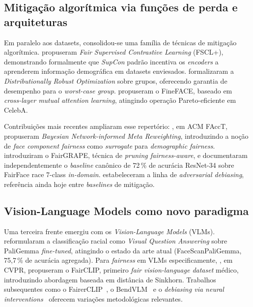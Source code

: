 \subsection{Mitigação algorítmica via funções de perda e arquiteturas}
\label{sec:rl_mitigacao}

Em paralelo aos datasets, consolidou-se uma família de técnicas de mitigação algorítmica. \textcite{park2022fair} propuseram \emph{Fair Supervised Contrastive Learning} (FSCL+), demonstrando formalmente que \emph{SupCon} padrão incentiva os \emph{encoders} a aprenderem informação demográfica em datasets enviesados. \textcite{sagawa2020distribution} formalizaram a \emph{Distributionally Robust Optimization} sobre grupos, oferecendo garantia de desempenho para o \emph{worst-case group}. \textcite{manzoor2024fineface} propuseram o FineFACE, baseado em \emph{cross-layer mutual attention learning}, atingindo operação Pareto-eficiente em CelebA.

Contribuições mais recentes ampliaram esse repertório: \textcite{liu2025component}, em ACM FAccT, propuseram \emph{Bayesian Network-informed Meta Reweighting}, introduzindo a noção de \emph{face component fairness} como \emph{surrogate} para \emph{demographic fairness}. \textcite{lin2022fairgrape} introduziram o FairGRAPE, técnica de \emph{pruning fairness-aware}, e documentaram independentemente o \emph{baseline} canônico de 72\,\% de acurácia ResNet-34 sobre FairFace race 7-class \emph{in-domain}. \textcite{zhang2018mitigating} estabeleceram a linha de \emph{adversarial debiasing}, referência ainda hoje entre \emph{baselines} de mitigação.

\subsection{Vision-Language Models como novo paradigma}
\label{sec:rl_vlm}

Uma terceira frente emergiu com os \emph{Vision-Language Models} (VLMs). \textcite{aldahoul2024exploring} reformularam a classificação racial como \emph{Visual Question Answering} sobre PaliGemma \emph{fine-tuned}, atingindo o estado da arte atual (FaceScanPaliGemma, 75,7\,\% de acurácia agregada). Para \emph{fairness} em VLMs especificamente, \textcite{luo2024fairclip}, em CVPR, propuseram o FairCLIP, primeiro \emph{fair vision-language dataset} médico, introduzindo abordagem baseada em distância de Sinkhorn. Trabalhos subsequentes como o FairerCLIP~\autocite{dehdashtian2024fairerclip}, o BendVLM~\autocite{gerych2024bendvlm} e o \emph{debiasing via neural interventions}~\autocite{debiasing2025debiasing} oferecem variações metodológicas relevantes.

